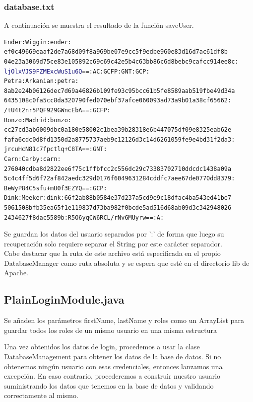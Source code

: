 \documentclass[10pt,a4paper]{article}
\begin{document}
\subsubsection*{database.txt}
A continuación se muestra el resultado de la función saveUser.
\begin{lstlisting}[language=bash]
Ender:Wiggin:ender:
ef0c49669eaaf2de7a68d09f8a969be07e9cc5f9edbe960e83d16d7ac61df8b
04e23a3069d75ce83e105892c69c69c42e5b4c63bb86c6d8bebc9cafcc914ee8c:
ljOlxVJS9FZMExcWuS1u6Q==:AC:GCFP:GNT:GCP:
Petra:Arkanian:petra:
8ab2e24b06126dec7d69a46826b109fe93c95bcc61b5fe8589aab519fbe49d34a
6435108c0fa5cc8da320790fed070ebf37afce060093ad73a9b01a38cf65662:
/tU4t2nr5PQF929GWncEbA==:GCFP:
Bonzo:Madrid:bonzo:
cc27cd3ab6009dbc0a180e58002c1bea39b28318e6b447075df09e8325eab62e
fafa6cdc0d8fd1350d2a8775737aeb9c12126d3c14d6261059fe9e4bd31f2da3:
jrcuHcN81c7fpctlq+C8TA==:GNT:
Carn:Carby:carn:
276040cdba8d2822ee6f75c1ffbfcc2c556dc29c73383702710ddcdc1438a09a
5c4c4ff5d6f72af842aedc329d0176f6049631284cddfc7aee67de0770dd8379:
BeWyP84C5sfu+mU0f3EZYQ==:GCP:
Dink:Meeker:dink:66f2ab88b0584e37d237a5cd9e9c18dfac4ba543ed41be7
5061508bfb35ea65f1e119837d73ba982f0bcde5ad516d68ab09d3c342948026
2434627f8dac5589b:R5O6yqCW6RCL/rNv6MUyrw==:A:
\end{lstlisting}
Se guardan los datos del usuario separados por ':' de forma que luego su recuperación solo requiere separar el String por este carácter separador.\\
Cabe destacar que la ruta de este archivo está especificada en el propio DatabaseManager como ruta absoluta y se espera que esté en el directorio lib de Apache.

\subsection*{PlainLoginModule.java}
Se añaden los parámetros firstName, lastName y roles como un ArrayList para guardar todos los roles de un mismo usuario en una misma estructura


Una vez obtenidos los datos de login, procedemos a usar la clase DatabaseManagement para obtener los datos de la base de datos. Si no obtenemos ningún usuario con esas credenciales, entonces lanzamos una excepción. En caso contrario, procederemos a construir nuestro usuario suministrando los datos que tenemos en la base de datos y validando correctamente al mismo.

\end{document}
